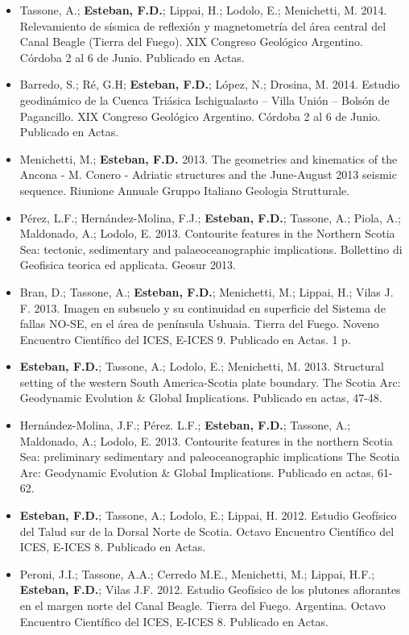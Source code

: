 \documentclass[11pt, a4paper]{article}
\begin{document}
\begin{itemize}
    \item Tassone, A.; \textbf{Esteban, F.D.}; Lippai, H.; Lodolo, E.; Menichetti, M. 2014. Relevamiento de sísmica de reflexión y magnetometría del área central del Canal Beagle (Tierra del Fuego). XIX Congreso Geológico Argentino. Córdoba 2 al 6 de Junio. Publicado en Actas.
    \item Barredo, S.; Ré, G.H; \textbf{Esteban, F.D.}; López, N.; Drosina, M. 2014. Estudio geodinámico de la Cuenca Triásica Ischigualasto – Villa Unión – Bolsón de Pagancillo. XIX Congreso Geológico Argentino. Córdoba 2 al 6 de Junio. Publicado en Actas.
    \item Menichetti, M.; \textbf{Esteban, F.D.} 2013. The geometries and kinematics of the Ancona - M. Conero - Adriatic structures and the June-August 2013 seismic sequence. Riunione Annuale Gruppo Italiano Geologia Strutturale.
    \item Pérez, L.F.; Hernández-Molina, F.J.; \textbf{Esteban, F.D.}; Tassone, A.; Piola, A.; Maldonado, A.; Lodolo, E. 2013. Contourite features in the Northern Scotia Sea: tectonic, sedimentary and palaeoceanographic implications. Bollettino di Geofisica teorica ed applicata. Geosur 2013.
    \item Bran, D.; Tassone, A.; \textbf{Esteban, F.D.}; Menichetti, M.; Lippai, H.; Vilas J. F. 2013. Imagen en subsuelo y su continuidad en superficie del Sistema de fallas NO-SE, en el área de península Ushuaia. Tierra del Fuego. Noveno Encuentro Científico del ICES, E-ICES 9. Publicado en Actas. 1 p.
    \item \textbf{Esteban, F.D.}; Tassone, A.; Lodolo, E.; Menichetti, M. 2013. Structural setting of the western South America-Scotia plate boundary. The Scotia Arc: Geodynamic Evolution \& Global Implications. Publicado en actas, 47-48.
    \item Hernández-Molina, J.F.; Pérez. L.F.; \textbf{Esteban, F.D.}; Tassone, A.; Maldonado, A.; Lodolo, E. 2013. Contourite features in the northern Scotia Sea: preliminary sedimentary and paleoceanographic implications The Scotia Arc: Geodynamic Evolution \& Global Implications. Publicado en actas, 61-62.
    \item \textbf{Esteban, F.D.}; Tassone, A.; Lodolo, E.; Lippai, H. 2012. Estudio Geofísico del Talud sur de la Dorsal Norte de Scotia. Octavo Encuentro Científico del ICES, E-ICES 8. Publicado en Actas.
    \item Peroni, J.I.; Tassone, A.A.; Cerredo M.E., Menichetti, M.; Lippai, H.F.; \textbf{Esteban, F.D.}; Vilas J.F. 2012. Estudio Geofísico de los plutones aflorantes en el margen norte del Canal Beagle. Tierra del Fuego. Argentina. Octavo Encuentro Científico del ICES, E-ICES 8. Publicado en Actas.

\end{itemize}
\end{document}
